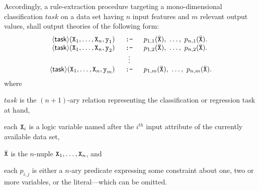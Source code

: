 \documentclass[12pt,a4paper,openright,twoside]{book}
\begin{document}
Accordingly, a rule-extraction procedure targeting a mono-dimensional classification $task$ on a data set having $n$ input features and $m$ relevant output values, shall output theories of the following form:
%
\begin{equation*}
    \begin{array}{rcl}
        \mathsf{\left\langle task\right\rangle}(\texttt{X}_1, \ldots, \texttt{X}_n, \texttt{y}_1) & \texttt{ :- } & p_{1,1}(\bar{\texttt{X}}),\ \ldots,\ p_{n,1}(\bar{\texttt{X}}).
        \\
        \mathsf{\left\langle task\right\rangle}(\texttt{X}_1, \ldots, \texttt{X}_n, \texttt{y}_2) & \texttt{ :- } & p_{1,2}(\bar{\texttt{X}}),\ \ldots,\ p_{n,2}(\bar{\texttt{X}}).
        \\
        & \vdots
        \\
        \mathsf{\left\langle task\right\rangle}(\texttt{X}_1, \ldots, \texttt{X}_n, \texttt{y}_m) & \texttt{ :- } & p_{1,m}(\bar{\texttt{X}}),\ \ldots,\ p_{n,m}(\bar{\texttt{X}}).
    \end{array}
\end{equation*}
%
where
%
\begin{inlinelist}
    \item $\mathit{task}$ is the $(n+1)$-ary relation representing the classification or regression task at hand,
    \item each $\texttt{X}_i$ is a logic variable named after the $i^{th}$ input attribute of the currently available data set,
    \item $\bar{\texttt{X}}$ is the $n$-nuple $\texttt{X}_1, \ldots, \texttt{X}_n$, and
    \item each $p_{i,j}$ is either a $n$-ary predicate expressing some constraint about one, two or more variables, or the  literal---which can be omitted.
\end{inlinelist}
\end{document}
